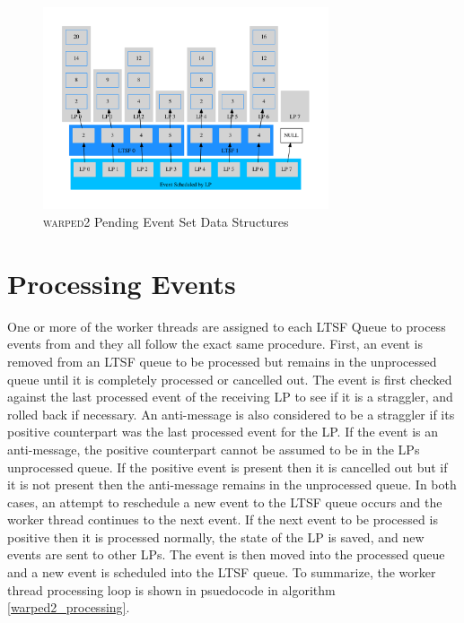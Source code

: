\documentclass[11pt]{book}
\begin{document}
\begin{figure}
    \centering
    \includegraphics[width=0.75\textwidth,quiet]{figs/graphviz/pending_event_set.pdf}
    \caption{\textsc{warped2} Pending Event Set Data Structures}\label{pending_event_set}
\end{figure}

\section{Processing Events}

One or more of the worker threads are assigned to each LTSF Queue to process events from
and they all follow the exact same procedure.  First, an event is removed from an LTSF
queue to be processed but remains in the unprocessed queue until it is completely processed or
cancelled out.  The event is first checked against the last processed event of the receiving LP
to see if it is a straggler, and rolled back if necessary.  An anti-message is also considered to
be a straggler if its positive counterpart was the last processed event for the LP.
If the event is an anti-message, the positive counterpart cannot be assumed to be in the LPs
unprocessed queue.  If the positive event is present then it is cancelled out but if it is not
present then the anti-message remains in the unprocessed queue.  In both cases, an attempt to
reschedule a new event to the LTSF queue occurs and the worker thread continues to the next
event.  If the next event to be processed is positive then it is processed normally, the state
of the LP is saved, and new events are sent to other LPs.  The event is then moved into the
processed queue and a new event is scheduled into the LTSF queue.  To summarize, the worker
thread processing loop is shown in psuedocode in algorithm \ref{warped2_processing}.
\end{document}
